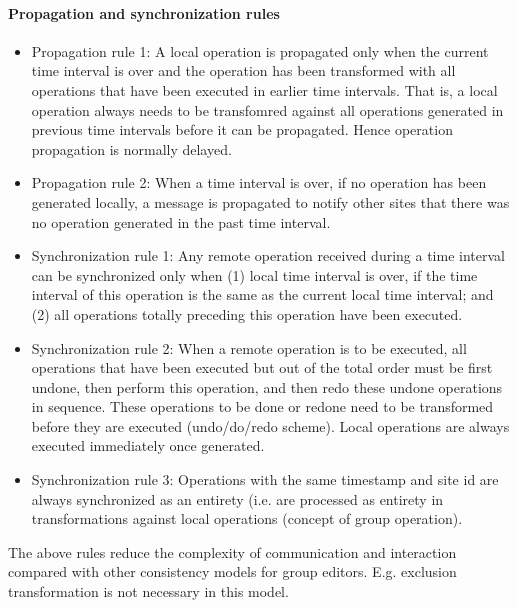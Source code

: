 \paragraph{Propagation and synchronization rules}
\begin{itemize}
 \item Propagation rule 1: A local operation is propagated only when the current time interval is over and the operation has been transformed with all operations that have been executed in earlier time intervals. That is, a local operation always needs to be transfomred against all operations generated in previous time intervals before it can be propagated. Hence operation propagation is normally delayed.
 \item Propagation rule 2: When a time interval is over, if no operation has been generated locally, a message is propagated to notify other sites that there was no operation generated in the past time interval. 
 \item Synchronization rule 1: Any remote operation received during a time interval can be synchronized only when (1) local time interval is over, if the time interval of this operation is the same as the current local time interval; and (2) all operations totally preceding this operation have been executed.
 \item Synchronization rule 2: When a remote operation is to be executed, all operations that have been executed but out of the total order must be first undone, then perform this operation, and then redo these undone operations in sequence. These operations to be done or redone need to be transformed before they are executed (undo/do/redo scheme). Local operations are always executed immediately once generated.
 \item Synchronization rule 3: Operations with the same timestamp and site id are always synchronized as an entirety (i.e. are processed as entirety in transformations against local operations (concept of group operation).
\end{itemize}
The above rules reduce the complexity of communication and interaction compared with other consistency models for group editors. E.g. exclusion transformation is not necessary in this model.


